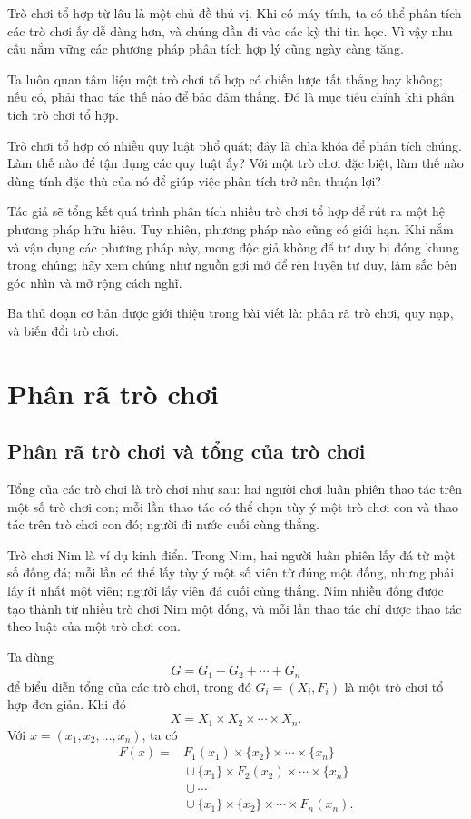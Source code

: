 \documentclass[11pt]{article}
\begin{document}
Trò chơi tổ hợp từ lâu là một chủ đề thú vị. Khi có máy tính, ta có thể phân
tích các trò chơi ấy dễ dàng hơn, và chúng dần đi vào các kỳ thi tin học. Vì
vậy nhu cầu nắm vững các phương pháp phân tích hợp lý cũng ngày càng tăng.

Ta luôn quan tâm liệu một trò chơi tổ hợp có chiến lược tất thắng hay không;
nếu có, phải thao tác thế nào để bảo đảm thắng. Đó là mục tiêu chính khi phân
tích trò chơi tổ hợp.

Trò chơi tổ hợp có nhiều quy luật phổ quát; đây là chìa khóa để phân tích
chúng. Làm thế nào để tận dụng các quy luật ấy? Với một trò chơi đặc biệt, làm
thế nào dùng tính đặc thù của nó để giúp việc phân tích trở nên thuận lợi?

Tác giả sẽ tổng kết quá trình phân tích nhiều trò chơi tổ hợp để rút ra một
hệ phương pháp hữu hiệu. Tuy nhiên, phương pháp nào cũng có giới hạn. Khi nắm
và vận dụng các phương pháp này, mong độc giả không để tư duy bị đóng khung
trong chúng; hãy xem chúng như nguồn gợi mở để rèn luyện tư duy, làm sắc bén
góc nhìn và mở rộng cách nghĩ.

Ba thủ đoạn cơ bản được giới thiệu trong bài viết là: phân rã trò chơi, quy
nạp, và biến đổi trò chơi.

\section{Phân rã trò chơi}

\subsection{Phân rã trò chơi và tổng của trò chơi}

Tổng của các trò chơi là trò chơi như sau: hai người chơi luân phiên thao tác
trên một số trò chơi con; mỗi lần thao tác có thể chọn tùy ý một trò chơi con
và thao tác trên trò chơi con đó; người đi nước cuối cùng thắng.

Trò chơi Nim là ví dụ kinh điển. Trong Nim, hai người luân phiên lấy đá từ một
số đống đá; mỗi lần có thể lấy tùy ý một số viên từ đúng một đống, nhưng phải
lấy ít nhất một viên; người lấy viên đá cuối cùng thắng. Nim nhiều đống được
tạo thành từ nhiều trò chơi Nim một đống, và mỗi lần thao tác chỉ được thao tác
theo luật của một trò chơi con.

Ta dùng
\[
  G=G_1+G_2+\cdots+G_n
\]
để biểu diễn tổng của các trò chơi, trong đó \(G_i=(X_i,F_i)\) là một trò chơi
tổ hợp đơn giản. Khi đó
\[
  X=X_1\times X_2\times\cdots\times X_n.
\]
Với \(x=(x_1,x_2,\ldots,x_n)\), ta có
\[
\begin{aligned}
F(x)
={}&F_1(x_1)\times\{x_2\}\times\cdots\times\{x_n\}\\
&{}\cup\{x_1\}\times F_2(x_2)\times\cdots\times\{x_n\}\\
&{}\cup\cdots\\
&{}\cup\{x_1\}\times\{x_2\}\times\cdots\times F_n(x_n).
\end{aligned}
\]
\end{document}
